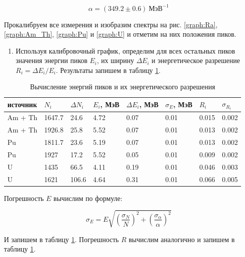 \documentclass[a4paper,12pt]{article}
\begin{document}
\begin{equation*}
    \alpha = (349.2 \pm 0.6) \ \text{МэВ}^{-1}
\end{equation*}

Прокалибруем все измерения и изобразим спектры на рис. \ref{graph:Ra}, \ref{graph:Am_Th}, \ref{graph:Pu} и \ref{graph:U} и отметим на них положения пиков.




\begin{enumerate}[resume]
    \item Используя калибровочный график, определим для всех остальных пиков значения энергии пиков $E_i$, их ширину $\Delta E_i$ и энергетическое разрешение $R_i = \Delta E_i / E_i$. Результаты запишем в таблицу \ref{table:2}.
\end{enumerate}

\begin{table}[!ht]
    \centering
    \begin{tabular}{|l|l|l|l|l|l|l|l|}
        \hline
        источник & $N_i$ & $\Delta N_i$ & $E_i$, МэВ  & $\Delta E_i$, МэВ & $\sigma_E$, МэВ & $R_i$ & $\sigma_{R_i}$  \\ \hline
        Am + Th & 1647.7 & 24.6  & 4.72 & 0.07 & 0.01 & 0.015 & 0.002 \\ \hline
        Am + Th & 1926.8 & 25.8  & 5.52 & 0.07 & 0.01 & 0.013 & 0.002 \\ \hline
        Pu      & 1811.7 & 23.6  & 5.19 & 0.07 & 0.01 & 0.013 & 0.002 \\ \hline
        Pu      & 1927   & 17.2  & 5.52 & 0.05 & 0.01 & 0.009 & 0.002 \\ \hline
        U       & 1435   & 66.5  & 4.11 & 0.19 & 0.01 & 0.046 & 0.003 \\ \hline
        U       & 1621   & 106.6 & 4.64 & 0.31 & 0.01 & 0.066 & 0.005 \\ \hline
    \end{tabular}
    \caption{Вычисление энергий пиков и их энергетического разрешения}
    \label{table:2}
\end{table}


Погрешность $E$ вычислим по формуле:

\begin{equation*}
    \sigma_E = E \sqrt{\left(\frac{\sigma_N}{N}\right)^2 + \left(\frac{\sigma_\alpha}{\alpha}\right)^2}
\end{equation*}

И запишем в таблицу \ref{table:2}. Погрешность $R$ вычислим аналогично и запишем в таблицу \ref{table:2}.
\end{document}
